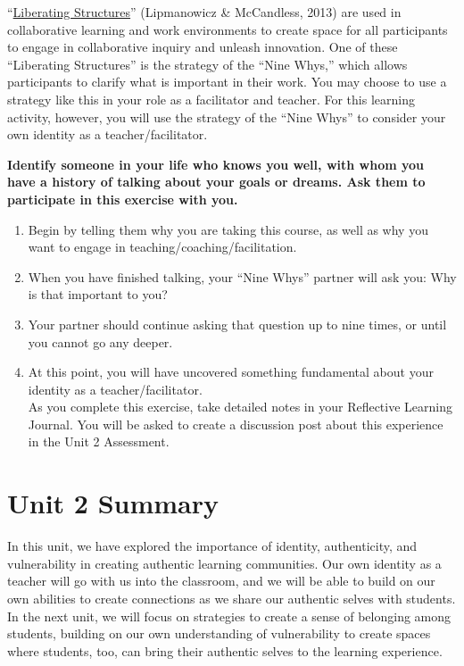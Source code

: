\documentclass[
]{book}
\providecommand{\tightlist}{%
  \setlength{\itemsep}{0pt}\setlength{\parskip}{0pt}}
\begin{document}
\begin{reflect}
``\href{https://www.liberatingstructures.com/ls-menu}{Liberating Structures}'' (Lipmanowicz \& McCandless, 2013) are used in collaborative learning and work environments to create space for all participants to engage in collaborative inquiry and unleash innovation. One of these ``Liberating Structures'' is the strategy of the ``Nine Whys,'' which allows participants to clarify what is important in their work. You may choose to use a strategy like this in your role as a facilitator and teacher. For this learning activity, however, you will use the strategy of the ``Nine Whys'' to consider your own identity as a teacher/facilitator.

\textbf{Identify someone in your life who knows you well, with whom you have a history of talking about your goals or dreams. Ask them to participate in this exercise with you.}

\begin{enumerate}
\def\labelenumi{\arabic{enumi}.}
\tightlist
\item
  Begin by telling them why you are taking this course, as well as why you want to engage in teaching/coaching/facilitation.\\
\item
  When you have finished talking, your ``Nine Whys'' partner will ask you: Why is that important to you?\\
\item
  Your partner should continue asking that question up to nine times, or until you cannot go any deeper.\\
\item
  At this point, you will have uncovered something fundamental about your identity as a teacher/facilitator.\\
  As you complete this exercise, take detailed notes in your Reflective Learning Journal. You will be asked to create a discussion post about this experience in the Unit 2 Assessment.
\end{enumerate}
\end{reflect}

\hypertarget{unit-2-summary}{%
\section*{Unit 2 Summary}\label{unit-2-summary}}

In this unit, we have explored the importance of identity, authenticity, and vulnerability in creating authentic learning communities. Our own identity as a teacher will go with us into the classroom, and we will be able to build on our own abilities to create connections as we share our authentic selves with students. In the next unit, we will focus on strategies to create a sense of belonging among students, building on our own understanding of vulnerability to create spaces where students, too, can bring their authentic selves to the learning experience.
\end{document}
